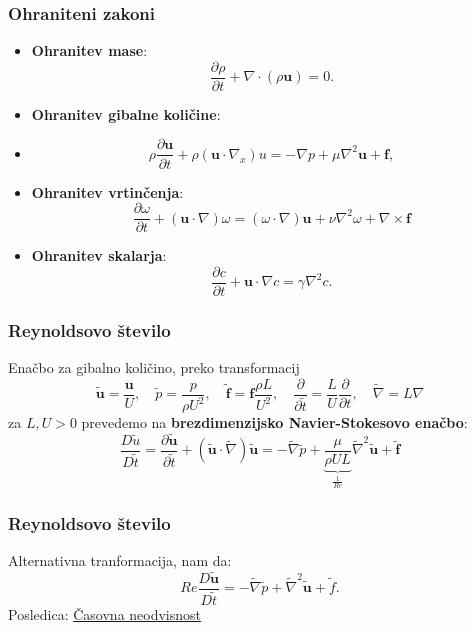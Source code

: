 \documentclass{beamer}
\newcommand{\bd}{\textbf}
\begin{document}
\begin{frame}
\frametitle{Ohraniteni zakoni}
\begin{itemize}
    \pause
    \item \textbf{Ohranitev mase}:
    \begin{equation}
        \frac{\partial \rho}{\partial t} + \nabla \cdot (\rho \bd{u}) = 0.
    \end{equation}
    \pause
    \item \textbf{Ohranitev gibalne količine}:
    \item 
    \begin{equation}
    \rho \frac{\partial \bd{u}}{\partial t} + \rho(\bd{u}\cdot \nabla_x) u = - \nabla p + \mu \nabla^2 \bd{u} + \bd{f},
    \end{equation}
    \pause
    \item \textbf{Ohranitev vrtinčenja}:
    \begin{equation}
    \frac{\partial \bd{$\omega$}}{\partial t} + (\bd{u}\cdot \nabla)\bd{$\omega$} = (\bd{$\omega$} \cdot \nabla)\bd{u}+ \nu \nabla^2 \bd{$\omega$} + \nabla \times \bd{f}
    \end{equation}
    \pause
    \item \textbf{Ohranitev skalarja}:
    \begin{equation}
        \frac{\partial c}{\partial t} + \bd{u}\cdot\nabla c = \gamma \nabla^2 c.
    \end{equation}        
\end{itemize}
\end{frame}

\begin{frame}
\frametitle{Reynoldsovo število}
\pause
Enačbo za gibalno količino, preko transformacij 
$$
\tilde{\bd{u}} = \frac{\bd{u}}{U}, \quad \tilde{p} = \frac{p}{\rho U^2}, \quad \tilde{\bd{f}} = \bd{f}\frac{\rho L}{U^2},
\quad \frac{\partial}{\partial \tilde{t}} = \frac{L}{U} \frac{\partial}{\partial t}, \quad 
\tilde{\nabla} = L\nabla
$$
za $L, U > 0$ prevedemo na \bd{brezdimenzijsko Navier-Stokesovo enačbo}:
$$
\frac{D\tilde{u}}{D \tilde{t}} = \frac{\partial \tilde{\bd{u}}}{\partial \tilde{t}} + 
(\tilde{\bd{u}} \cdot \tilde{\nabla}) \tilde{\bd{u}} = - \tilde{\nabla} \tilde{p}
+ \underbrace{\frac{\mu}{\rho UL}}_{\frac{1}{Re}} \tilde{\nabla}^2 \tilde{\bd{u}} + \tilde{\bd{f}}
$$
\end{frame}

\begin{frame}
\frametitle{Reynoldsovo število}
Alternativna tranformacija, nam da:
\begin{equation*}
    Re\frac{D\tilde{\bd{u}}}{D \tilde{t}} =  - \tilde{\nabla} \tilde{p}
    + \tilde{\nabla}^2 \tilde{\bd{u}} + \tilde{f}.
\end{equation*}
Posledica: \href{https://www.youtube.com/watch?v=h1DnrWEOWeg&feature=youtu.be}{Časovna neodvisnost}
\end{frame}
\end{document}
